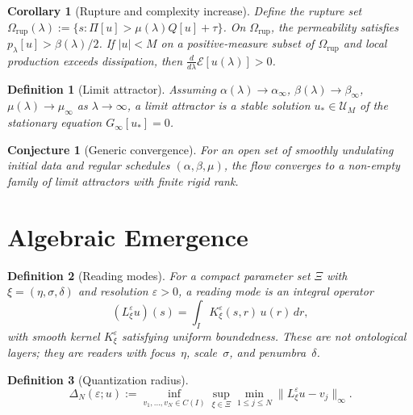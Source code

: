 \documentclass[11pt,a4paper]{article}
\newtheorem{definition}{Definition}
\newtheorem{corollary}{Corollary}
\newtheorem{conjecture}{Conjecture}
\newcommand{\UM}{\mathcal{U}_M}
\begin{document}
\begin{corollary}[Rupture and complexity increase]
\label{cor:rupture}
Define the rupture set
$\Omega_{\mathrm{rup}}(\lambda) := \{s : \Pi[u] > \mu(\lambda)Q[u] + \tau\}$.
On $\Omega_{\mathrm{rup}}$, the permeability satisfies
$p_\lambda[u] > \beta(\lambda)/2$.
If $|u| < M$ on a positive-measure subset of $\Omega_{\mathrm{rup}}$
and local production exceeds dissipation, then
$\frac{d}{d\lambda}\mathcal{E}[u(\lambda)] > 0$.
\end{corollary}

\begin{definition}[Limit attractor]
\label{def:attractor}
Assuming $\alpha(\lambda) \to \alpha_\infty$,
$\beta(\lambda) \to \beta_\infty$,
$\mu(\lambda) \to \mu_\infty$ as $\lambda \to \infty$,
a \emph{limit attractor} is a stable solution $u_* \in \UM$ of
the stationary equation $G_\infty[u_*] = 0$.
\end{definition}

\begin{conjecture}[Generic convergence]
\label{conj:convergence}
For an open set of smoothly undulating initial data and regular
schedules $(\alpha,\beta,\mu)$, the flow converges to a non-empty
family of limit attractors with finite rigid rank.
\end{conjecture}

\section{Algebraic Emergence}

\begin{definition}[Reading modes]
\label{def:reading}
For a compact parameter set $\Xi$ with $\xi = (\eta,\sigma,\delta)$
and resolution $\varepsilon > 0$, a \emph{reading mode} is an
integral operator
\[
(L_\xi^\varepsilon u)(s) = \int_I K_\xi^\varepsilon(s,r)\,u(r)\,dr,
\]
with smooth kernel $K_\xi^\varepsilon$ satisfying uniform boundedness.
These are \emph{not} ontological layers; they are readers with focus~$\eta$,
scale~$\sigma$, and penumbra~$\delta$.
\end{definition}

\begin{definition}[Quantization radius]
\label{def:quant}
\[
\Delta_N(\varepsilon; u) := \inf_{v_1,\ldots,v_N \in C(I)}
\sup_{\xi \in \Xi} \min_{1\le j\le N}
\|L_\xi^\varepsilon u - v_j\|_\infty.
\]
\end{definition}
\end{document}
